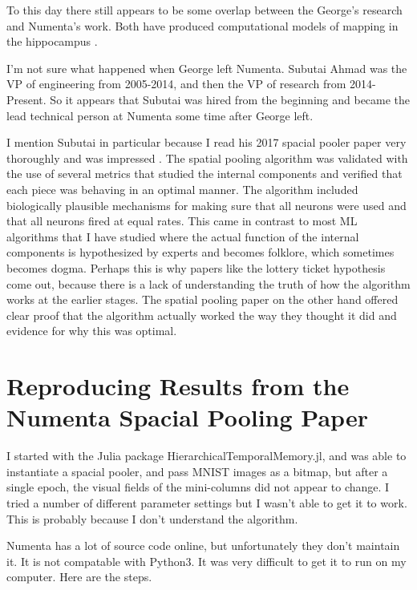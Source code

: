 \documentclass{article}
\begin{document}
To this day there still appears to be some overlap between the George's research and Numenta's work. Both have produced computational models of mapping in the hippocampus \cite{George2021, Lewis2021}.

I'm not sure what happened when George left Numenta. Subutai Ahmad was the VP of engineering from 2005-2014, and then the VP of research from 2014-Present. So it appears that Subutai was hired from the beginning and became the lead technical person at Numenta some time after George left.

I mention Subutai in particular because I read his 2017 spacial pooler paper very thoroughly and was  impressed \cite{Cui2017}. The spatial pooling algorithm was validated with the use of several metrics that studied the internal components and verified that each piece was behaving in an optimal manner. The algorithm included biologically plausible mechanisms for making sure that all neurons were used and that all neurons fired at equal rates. This came in contrast to most ML algorithms that I have studied where the actual function of the internal components is hypothesized by experts and becomes folklore, which sometimes becomes dogma. Perhaps this is why papers like the lottery ticket hypothesis come out, because there is a lack of understanding the truth of how the algorithm works at the earlier stages. The spatial pooling paper on the other hand offered clear proof that the algorithm actually worked the way they thought it did and evidence for why this was optimal.

\section*{Reproducing Results from the Numenta Spacial Pooling Paper}

I started with the Julia package HierarchicalTemporalMemory.jl, and was able to instantiate a spacial pooler, and pass MNIST images as a bitmap, but after a single epoch, the visual fields of the mini-columns did not appear to change. I tried a number of different parameter settings but I wasn't able to get it to work. This is probably because I don't understand the algorithm.

Numenta has a lot of source code online, but unfortunately they don't maintain it. It is not compatable with Python3. It was very difficult to get it to run on my computer. Here are the steps.
\end{document}
